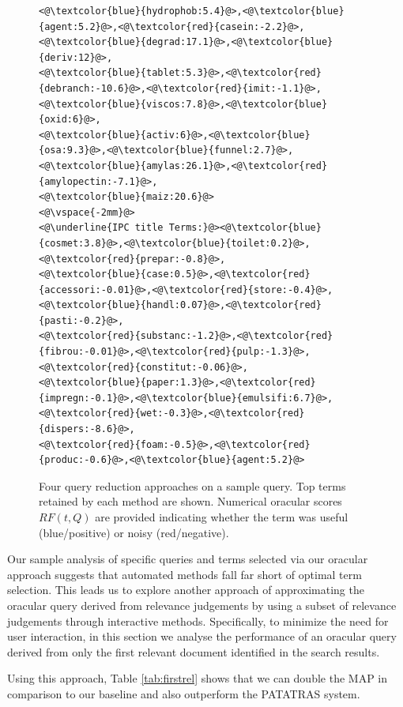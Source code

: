 \begin{figure}[t!]
\begin{framed}
\begin{lstlisting}[basicstyle=\scriptsize\ttfamily , linewidth=\columnwidth,breaklines=true]
<@\textcolor{blue}{hydrophob:5.4}@>,<@\textcolor{blue}{agent:5.2}@>,<@\textcolor{red}{casein:-2.2}@>,<@\textcolor{blue}{degrad:17.1}@>,<@\textcolor{blue}{deriv:12}@>,
<@\textcolor{blue}{tablet:5.3}@>,<@\textcolor{red}{debranch:-10.6}@>,<@\textcolor{red}{imit:-1.1}@>,<@\textcolor{blue}{viscos:7.8}@>,<@\textcolor{blue}{oxid:6}@>,
<@\textcolor{blue}{activ:6}@>,<@\textcolor{blue}{osa:9.3}@>,<@\textcolor{blue}{funnel:2.7}@>,<@\textcolor{blue}{amylas:26.1}@>,<@\textcolor{red}{amylopectin:-7.1}@>,
<@\textcolor{blue}{maiz:20.6}@>
<@\vspace{-2mm}@>
<@\underline{IPC title Terms:}@><@\textcolor{blue}{cosmet:3.8}@>,<@\textcolor{blue}{toilet:0.2}@>,<@\textcolor{red}{prepar:-0.8}@>,
<@\textcolor{blue}{case:0.5}@>,<@\textcolor{red}{accessori:-0.01}@>,<@\textcolor{red}{store:-0.4}@>,<@\textcolor{blue}{handl:0.07}@>,<@\textcolor{red}{pasti:-0.2}@>,
<@\textcolor{red}{substanc:-1.2}@>,<@\textcolor{red}{fibrou:-0.01}@>,<@\textcolor{red}{pulp:-1.3}@>,<@\textcolor{red}{constitut:-0.06}@>,
<@\textcolor{blue}{paper:1.3}@>,<@\textcolor{red}{impregn:-0.1}@>,<@\textcolor{blue}{emulsifi:6.7}@>,<@\textcolor{red}{wet:-0.3}@>,<@\textcolor{red}{dispers:-8.6}@>,
<@\textcolor{red}{foam:-0.5}@>,<@\textcolor{red}{produc:-0.6}@>,<@\textcolor{blue}{agent:5.2}@>
 \end{lstlisting} 
 \vspace*{-2ex}
\end{framed}
 \vspace*{-2ex}
  \caption{Four query reduction approaches on a sample query.  Top
    terms retained by each method are shown.  Numerical oracular
    scores $\mathit{RF}(t,Q)$ are provided indicating whether the term
    was useful (blue/positive) or noisy (red/negative).}
  \label{fig:anecdotal}  
\end{figure}

Our sample analysis of specific queries and terms selected via our oracular
approach suggests that automated methods fall far short of optimal term selection.
This leads us to explore another approach of approximating the oracular query
derived from relevance judgements by using a subset of relevance judgements
through interactive methods.  Specifically, to minimize the need for user interaction,
in this section we analyse the performance of an oracular query derived from
only the first relevant document identified in the search results.

Using this approach, Table \ref{tab:firstrel} shows that we can double the MAP in comparison to our baseline and also outperform the PATATRAS system.

